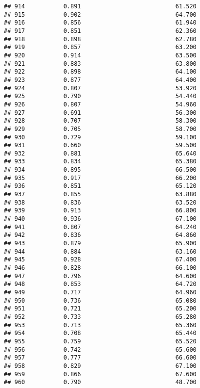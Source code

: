 \documentclass[
]{article}
\begin{document}
\begin{verbatim}
## 914           0.891                           61.520
## 915           0.902                           64.700
## 916           0.856                           61.940
## 917           0.851                           62.360
## 918           0.898                           62.780
## 919           0.857                           63.200
## 920           0.914                           63.500
## 921           0.883                           63.800
## 922           0.898                           64.100
## 923           0.877                           64.400
## 924           0.807                           53.920
## 925           0.790                           54.440
## 926           0.807                           54.960
## 927           0.691                           56.300
## 928           0.707                           58.300
## 929           0.705                           58.700
## 930           0.729                           59.100
## 931           0.660                           59.500
## 932           0.881                           65.640
## 933           0.834                           65.380
## 934           0.895                           66.500
## 935           0.917                           66.200
## 936           0.851                           65.120
## 937           0.855                           63.880
## 938           0.836                           63.520
## 939           0.913                           66.800
## 940           0.936                           67.100
## 941           0.807                           64.240
## 942           0.836                           64.860
## 943           0.879                           65.900
## 944           0.884                           63.160
## 945           0.928                           67.400
## 946           0.828                           66.100
## 947           0.796                           64.600
## 948           0.853                           64.720
## 949           0.717                           64.960
## 950           0.736                           65.080
## 951           0.721                           65.200
## 952           0.733                           65.280
## 953           0.713                           65.360
## 954           0.708                           65.440
## 955           0.759                           65.520
## 956           0.742                           65.600
## 957           0.777                           66.600
## 958           0.829                           67.100
## 959           0.866                           67.600
## 960           0.790                           48.700

\end{verbatim}
\end{document}
